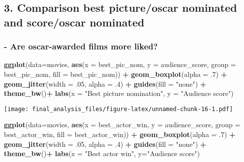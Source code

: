 \documentclass[]{article}
\newenvironment{Shaded}{\begin{snugshade}}{\end{snugshade}}
\newcommand{\KeywordTok}[1]{\textcolor[rgb]{0.13,0.29,0.53}{\textbf{#1}}}
\newcommand{\DataTypeTok}[1]{\textcolor[rgb]{0.13,0.29,0.53}{#1}}
\newcommand{\DecValTok}[1]{\textcolor[rgb]{0.00,0.00,0.81}{#1}}
\newcommand{\StringTok}[1]{\textcolor[rgb]{0.31,0.60,0.02}{#1}}
\newcommand{\OperatorTok}[1]{\textcolor[rgb]{0.81,0.36,0.00}{\textbf{#1}}}
\newcommand{\NormalTok}[1]{#1}
\begin{document}
\subsection{3. Comparison best picture/oscar nominated and score/oscar
nominated}\label{comparison-best-pictureoscar-nominated-and-scoreoscar-nominated}

\subsubsection{- Are oscar-awarded films more
liked?}\label{are-oscar-awarded-films-more-liked}

\begin{Shaded}
\begin{Highlighting}[]
\KeywordTok{ggplot}\NormalTok{(}\DataTypeTok{data=}\NormalTok{movies, }\KeywordTok{aes}\NormalTok{(}\DataTypeTok{x =}\NormalTok{ best_pic_nom, }\DataTypeTok{y =}\NormalTok{ audience_score, }\DataTypeTok{group =}\NormalTok{ best_pic_nom, }\DataTypeTok{fill =}\NormalTok{ best_pic_nom)) }\OperatorTok{+}\StringTok{ }\KeywordTok{geom_boxplot}\NormalTok{(}\DataTypeTok{alpha =}\NormalTok{ .}\DecValTok{7}\NormalTok{) }\OperatorTok{+}\StringTok{ }\KeywordTok{geom_jitter}\NormalTok{(}\DataTypeTok{width =}\NormalTok{ .}\DecValTok{05}\NormalTok{, }\DataTypeTok{alpha =}\NormalTok{ .}\DecValTok{4}\NormalTok{) }\OperatorTok{+}\StringTok{ }\KeywordTok{guides}\NormalTok{(}\DataTypeTok{fill =} \StringTok{"none"}\NormalTok{) }\OperatorTok{+}\StringTok{ }\KeywordTok{theme_bw}\NormalTok{()}\OperatorTok{+}
\KeywordTok{labs}\NormalTok{(}\DataTypeTok{x =} \StringTok{"Best picture nomination"}\NormalTok{, }\DataTypeTok{y =} \StringTok{"Audience score"}\NormalTok{)}
\end{Highlighting}
\end{Shaded}

\texttt{[image: final\_analysis\_files/figure-latex/unnamed-chunk-16-1.pdf]}

\begin{Shaded}
\begin{Highlighting}[]
\KeywordTok{ggplot}\NormalTok{(}\DataTypeTok{data=}\NormalTok{movies, }\KeywordTok{aes}\NormalTok{(}\DataTypeTok{x =}\NormalTok{ best_actor_win, }\DataTypeTok{y =}\NormalTok{ audience_score, }\DataTypeTok{group =}\NormalTok{ best_actor_win, }\DataTypeTok{fill =}\NormalTok{ best_actor_win)) }\OperatorTok{+}\StringTok{ }\KeywordTok{geom_boxplot}\NormalTok{(}\DataTypeTok{alpha =}\NormalTok{ .}\DecValTok{7}\NormalTok{) }\OperatorTok{+}\StringTok{ }\KeywordTok{geom_jitter}\NormalTok{(}\DataTypeTok{width =}\NormalTok{ .}\DecValTok{05}\NormalTok{, }\DataTypeTok{alpha =}\NormalTok{ .}\DecValTok{4}\NormalTok{) }\OperatorTok{+}\StringTok{ }\KeywordTok{guides}\NormalTok{(}\DataTypeTok{fill =} \StringTok{"none"}\NormalTok{) }\OperatorTok{+}\StringTok{ }\KeywordTok{theme_bw}\NormalTok{()}\OperatorTok{+}
\StringTok{  }\KeywordTok{labs}\NormalTok{(}\DataTypeTok{x =} \StringTok{"Best actor win"}\NormalTok{, }\DataTypeTok{y=}\StringTok{"Audience score"}\NormalTok{)}
\end{Highlighting}
\end{Shaded}
\end{document}
